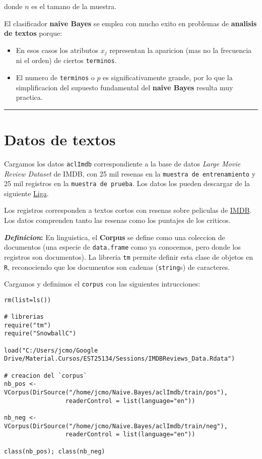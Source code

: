 \documentclass[11pt,]{article}
\begin{document}
donde \(n\) es el tamano de la muestra.

El clasificador \textbf{naive Bayes} se emplea con mucho exito en
problemas de \textbf{analisis de textos} porque:

\begin{itemize}
\item
  En esos casos los atributos \(x_j\) representan la aparicion (mas no
  la frecuencia ni el orden) de ciertos \texttt{terminos}.
\item
  El numero de \texttt{terminos} o \(p\) es significativamente grande,
  por lo que la simplificacion del supuesto fundamental del
  \textbf{naive Bayes} resulta muy practica.
\end{itemize}

\begin{center}\rule{0.5\linewidth}{\linethickness}\end{center}

\section{Datos de textos}\label{datos-de-textos}

Cargamos los datos \texttt{aclImdb} correspondiente a la base de datos
\emph{Large Movie Review Dataset} de IMDB, con 25 mil resenas en la
\texttt{muestra\ de\ entrenamiento} y 25 mil registros en la
\texttt{muestra\ de\ prueba}. Los datos los pueden descargar de la
siguiente
\href{http://ai.stanford.edu/~amaas/data/sentiment/index.html}{Liga}.

Los registros corresponden a textos cortos con resenas sobre peliculas
de \href{http://www.imdb.com}{IMDB}. Los datos comprenden tanto las
resenas como los puntajes de los criticos.

\textbf{\emph{Definicion}:} En linguistica, el \textbf{Corpus} se define
como una coleccion de documentos (una especie de \texttt{data.frame}
como ya conocemos, pero donde los registros son documentos). La libreria
\texttt{tm} permite definir esta clase de objetos en \texttt{R},
reconociendo que los documentos son cadenas (\texttt{string}s) de
caracteres.

Cargamos y definimos el \texttt{corpus} con las siguientes intrucciones:

\begin{verbatim}
rm(list=ls())

# librerias
require("tm")
require("SnowballC")

load("C:/Users/jcmo/Google Drive/Material.Cursos/EST25134/Sessions/IMDBReviews_Data.Rdata")

# creacion del `corpus`
nb_pos <- VCorpus(DirSource("/home/jcmo/Naive.Bayes/aclImdb/train/pos"), 
                 readerControl = list(language="en"))

nb_neg <- VCorpus(DirSource("/home/jcmo/Naive.Bayes/aclImdb/train/neg"), 
                 readerControl = list(language="en"))

class(nb_pos); class(nb_neg)
\end{verbatim}
\end{document}
